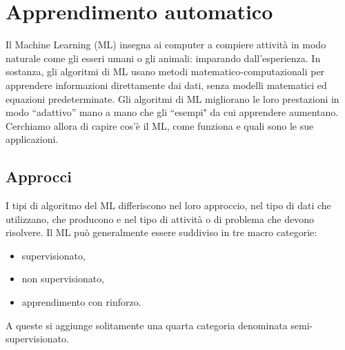 \documentclass[12pt,italian]{report}
\begin{document}
\frontespizio
\beforepreface

% 
%

         
% 
%


%
%


%
%

\afterpreface

% 
% 

\chapter{Apprendimento automatico}
\label{cap:apprendimento_automatico}
Il Machine Learning (ML) insegna ai computer a compiere attività in modo naturale come gli esseri umani o gli animali: imparando dall’esperienza. In sostanza, gli algoritmi di ML usano metodi matematico-computazionali per apprendere informazioni direttamente dai dati, senza modelli matematici ed equazioni predeterminate. Gli algoritmi di ML migliorano le loro prestazioni in modo ``adattivo” mano a mano che gli ``esempi" da cui apprendere aumentano. Cerchiamo allora di capire cos’è il ML, come funziona e quali sono le sue applicazioni.
\section{Approcci}
\label{sec:approcci}

I tipi di algoritmo del ML differiscono nel loro approccio, nel tipo di dati che utilizzano, che producono e nel tipo di attività o di problema che devono risolvere. Il ML può generalmente essere suddiviso in tre macro categorie: 
\begin{itemize}
	\item supervisionato,
	\item non supervisionato,
	\item apprendimento con rinforzo.
\end{itemize}
A queste si aggiunge solitamente una quarta categoria denominata semi-supervisionato.
\end{document}
